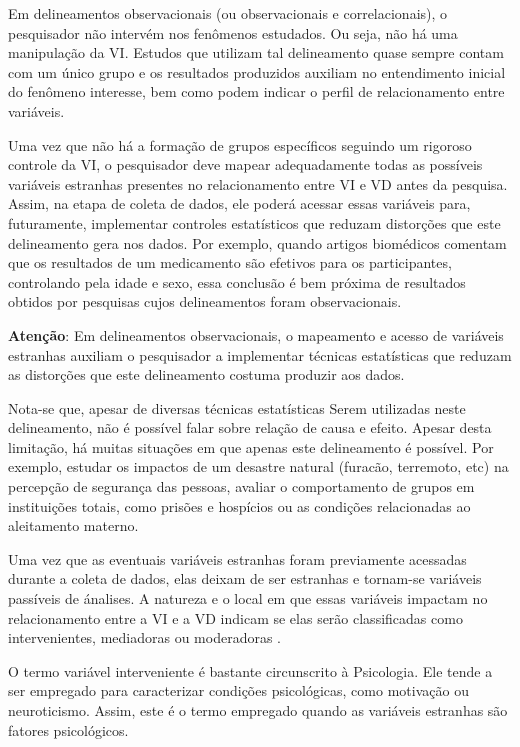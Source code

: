 \documentclass[
]{book}
\begin{document}
Em delineamentos observacionais (ou observacionais e correlacionais), o pesquisador não intervém nos fenômenos estudados. Ou seja, não há uma manipulação da VI. Estudos que utilizam tal delineamento quase sempre contam com um único grupo e os resultados produzidos auxiliam no entendimento inicial do fenômeno interesse, bem como podem indicar o perfil de relacionamento entre variáveis.

Uma vez que não há a formação de grupos específicos seguindo um rigoroso controle da VI, o pesquisador deve mapear adequadamente todas as possíveis variáveis estranhas presentes no relacionamento entre VI e VD antes da pesquisa. Assim, na etapa de coleta de dados, ele poderá acessar essas variáveis para, futuramente, implementar controles estatísticos que reduzam distorções que este delineamento gera nos dados. Por exemplo, quando artigos biomédicos comentam que os resultados de um medicamento são efetivos para os participantes, controlando pela idade e sexo, essa conclusão é bem próxima de resultados obtidos por pesquisas cujos delineamentos foram observacionais.

\begin{warning}

\textbf{Atenção}: Em delineamentos observacionais, o mapeamento e acesso de variáveis estranhas auxiliam o pesquisador a implementar técnicas estatísticas que reduzam as distorções que este delineamento costuma produzir aos dados.

\end{warning}

Nota-se que, apesar de diversas técnicas estatísticas Serem utilizadas neste delineamento, não é possível falar sobre relação de causa e efeito. Apesar desta limitação, há muitas situações em que apenas este delineamento é possível. Por exemplo, estudar os impactos de um desastre natural (furacão, terremoto, etc) na percepção de segurança das pessoas, avaliar o comportamento de grupos em instituições totais, como prisões e hospícios ou as condições relacionadas ao aleitamento materno.

Uma vez que as eventuais variáveis estranhas foram previamente acessadas durante a coleta de dados, elas deixam de ser estranhas e tornam-se variáveis passíveis de ánalises. A natureza e o local em que essas variáveis impactam no relacionamento entre a VI e a VD indicam se elas serão classificadas como intervenientes, mediadoras ou moderadoras \citep{Rooney2019, hayes2013}.

O termo variável interveniente é bastante circunscrito à Psicologia. Ele tende a ser empregado para caracterizar condições psicológicas, como motivação ou neuroticismo. Assim, este é o termo empregado quando as variáveis estranhas são fatores psicológicos.
\end{document}
